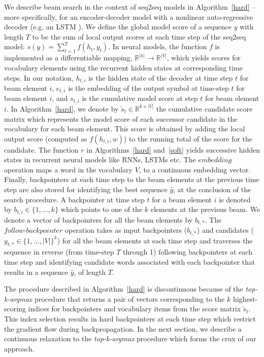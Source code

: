\documentclass[letterpaper]{article} \usepackage{aaai18}  \usepackage{times}  \usepackage{helvet}  \usepackage{courier}  \usepackage{url}  \usepackage{graphicx}  \frenchspacing
\begin{document}
We describe beam search in the context of seq2seq models in Algorithm~\ref{hard} -- more specifically, for an encoder-decoder \cite{sutskever2014sequence} model with a nonlinear auto-regressive decoder (e.g. an LSTM \cite{hochreiter1997long}). We define the global model score of a sequence $y$ with length $T$ to be the sum of local output scores at each time step of the seq2seq model: $s(y) = \sum_{t=1}^T f(h_t, y_t)$. In neural models, the function $f$ is implemented as a differentiable mapping, $\mathbb{R}^{|h|} \rightarrow \mathbb{R}^{|V|}$, which yields scores for vocabulary elements using the recurrent hidden states at corresponding time steps. In our notation, $h_{t,i}$ is the hidden state of the decoder at time step $t$ for beam element $i$, $e_{t,i}$ is the embedding of the output symbol at time-step $t$ for beam element $i$, and $s_{t,i}$ is the cumulative model score at step $t$ for beam element $i$. In Algorithm~\ref{hard}, we denote by $\tilde{s}_t \in \mathbb{R}^{k \times |V|}$ the cumulative candidate score matrix which represents the model score of each successor candidate in the vocabulary for each beam element. This score is obtained by adding the local output score (computed as $f(h_{t,i},w)$) to the running total of the score for the candidate. The function $r$ in Algorithms~\ref{hard} and~\ref{soft} yields successive hidden states in recurrent neural models like RNNs, LSTMs etc. The $\textit{embedding}$ operation maps a word in the vocabulary $V$, to a continuous embedding vector. Finally, backpointers at each time step to the beam elements at the previous time step are also stored for identifying the best sequence $\hat{y}$, at the conclusion of the search procedure. A backpointer at time step $t$ for a beam element $i$ is denoted by $\textit{b}_{t,i} \in \{1, \ldots, k\}$ which points to one of the $k$ elements at the previous beam. We denote a vector of backpointers for all the beam elements by $\textit{b}_{t,*}$. The $\textit{follow-backpointer}$ operation takes as input backpointers ($b_{t,*}$) and candidates ($y_{t,*} \in \{1, \ldots, |V|\}^k$) for all the beam elements at each time step and traverses the sequence in reverse (from time-step $T$ through 1) following backpointers at each time step and identifying candidate words associated with each backpointer that results in a sequence $\hat{y}$, of length $T$. 

The procedure described in Algorithm~\ref{hard} is discontinuous because of the \textit{top-k-argmax} procedure that returns a pair of vectors corresponding to the $k$ highest-scoring indices for backpointers and vocabulary items from the score matrix $\tilde s_t$. This index selection results in hard backpointers at each time step which restrict the gradient flow during backpropagation.
In the next section, we describe a continuous relaxation to the \textit{top-k-argmax} procedure which forms the crux of our approach.
\end{document}
